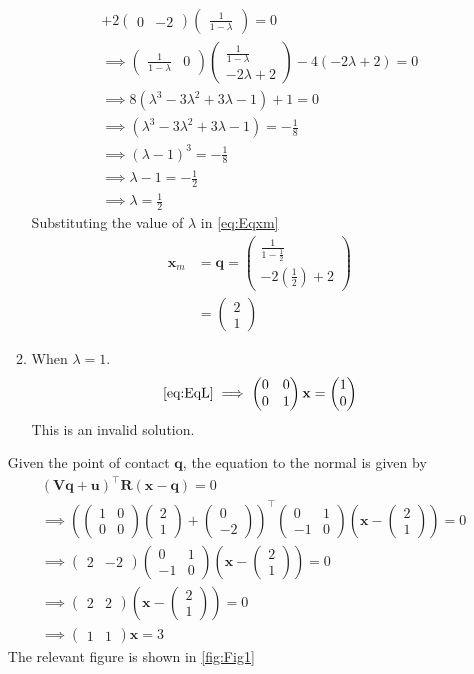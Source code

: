 \documentclass[12pt]{article}
\providecommand{\brak}[1]{\ensuremath{\left(#1\right)}}
\newcommand{\myvec}[1]{\ensuremath{\begin{pmatrix}#1\end{pmatrix}}}
\let\vec\mathbf
\begin{document}
\begin{enumerate}
\begin{enumerate}
\begin{multline}
	+ 2\myvec{0 & -2}\myvec{\frac{1}{1-\lambda}} = 0 \\ 
	\implies \myvec{\frac{1}{1-\lambda} & 0}\myvec{\frac{1}{1-\lambda} \\ -2\lambda+2} - 4\brak{-2\lambda+2} = 0 \\
	\implies 8\brak{\lambda^3 -3\lambda^2+3\lambda-1} +1 = 0 \\ 
	\implies \brak{\lambda^3 -3\lambda^2+3\lambda-1}  = -\frac{1}{8} \\ 
	 \implies \brak{\lambda-1}^3 = -\frac{1}{8} \\ 
	 \implies \lambda-1 = -\frac{1}{2} \\
	 \implies \lambda = \frac{1}{2}
\end{multline}
Substituting the value of $\lambda$ in    \eqref{eq:Eqxm}
\begin{align}
	\vec{x}_{m} &= \vec{q} = \myvec{ \frac{1}{1-\frac{1}{2}} \\ -2\brak{\frac{1}{2}}+2} \\
	&= \myvec{2 \\ 1}
\end{align}
\item When $\lambda = 1$. 
\begin{align}
	\eqref{eq:EqL} \implies \myvec{0 & 0 \\ 0&1}\vec{x} = \myvec{1 \\ 0}
\end{align}
This is an invalid solution. 
\end{enumerate}
Given the point of contact $\vec{q}$, the equation to the normal is given by
\begin{align}
	&\brak{\vec{V}\vec{q}+\vec{u}}^\top\vec{R}\brak{\vec{x}-\vec{q}} = 0 \\
	&\implies \brak{\myvec{1&0\\0&0}\myvec{2\\1}+\myvec{0 \\ -2}}^\top \myvec{0&1 \\-1&0}\brak{\vec{x}-\myvec{2\\1}} =0\\
	&\implies \myvec{2&-2} \myvec{0&1 \\-1&0}\brak{\vec{x}-\myvec{2\\1}} = 0 \\
	&\implies \myvec{2&2}\brak{\vec{x}-\myvec{2\\1}} = 0 \\
	&\implies \myvec{1&1}\vec{x} = 3 
\end{align}
The relevant figure is shown in \ref{fig:Fig1}

\end{enumerate}
\end{document}
